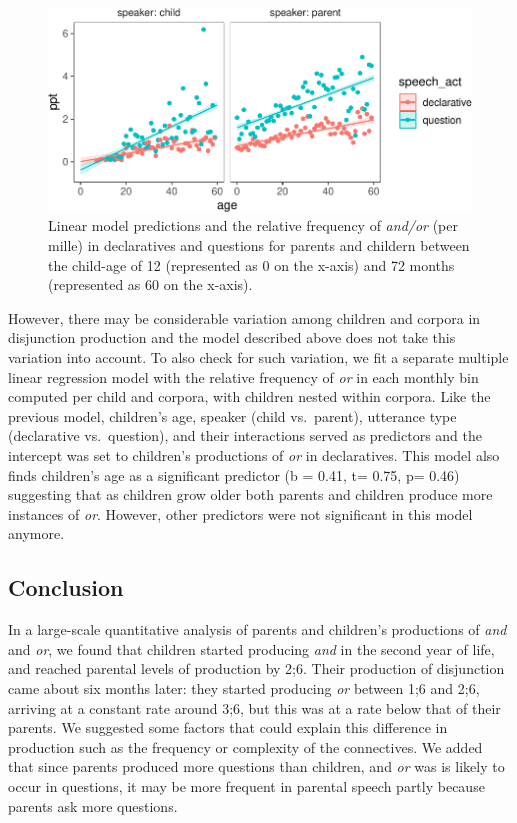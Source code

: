 \documentclass[
  english,
  ,man,floatsintext]{apa6}
\begin{document}
\begin{figure}[tb]

{\centering \includegraphics{figs/disjunctionPrediction-1} 

}

\caption{Linear model predictions and the relative frequency of \textit{and/or} (per mille) in declaratives and questions for parents and childern between the child-age of 12 (represented as 0 on the x-axis) and 72 months (represented as 60 on the x-axis).}\label{fig:disjunctionPrediction}
\end{figure}

However, there may be considerable variation among children and corpora in disjunction production and the model described above does not take this variation into account. To also check for such variation, we fit a separate multiple linear regression model with the relative frequency of \emph{or} in each monthly bin computed per child and corpora, with children nested within corpora. Like the previous model, children's age, speaker (child vs.~parent), utterance type (declarative vs.~question), and their interactions served as predictors and the intercept was set to children's productions of \emph{or} in declaratives. This model also finds children's age as a significant predictor (b = 0.41, t= 0.75, p= 0.46) suggesting that as children grow older both parents and children produce more instances of \emph{or}. However, other predictors were not significant in this model anymore.

\hypertarget{study1discussion}{%
\subsection{Conclusion}\label{study1discussion}}

In a large-scale quantitative analysis of parents and children's productions of \emph{and} and \emph{or}, we found that children started producing \emph{and} in the second year of life, and reached parental levels of production by 2;6. Their production of disjunction came about six months later: they started producing \emph{or} between 1;6 and 2;6, arriving at a constant rate around 3;6, but this was at a rate below that of their parents. We suggested some factors that could explain this difference in production such as the frequency or complexity of the connectives. We added that since parents produced more questions than children, and \emph{or} was is likely to occur in questions, it may be more frequent in parental speech partly because parents ask more questions.
\end{document}
